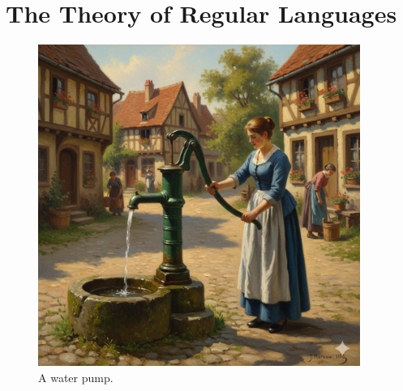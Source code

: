 \chapter{The Theory of Regular Languages \label{chapter:regular-languages}}

\begin{figure}[h] 
\centering
  \includegraphics[width=10.5cm]{Abbildungen/pump.png}
\caption{A water pump.}
\label{fig:chapter-image}
\end{figure}

